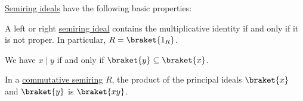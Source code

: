 \begin{proposition}\label{thm:def:semiring_ideal/properties}
  \hyperref[def:semiring_ideal]{Semiring ideals} have the following basic properties:
  \begin{thmenum}
     A left or right \hyperref[def:semiring_ideal]{semiring ideal} contains the multiplicative identity if and only if it is not proper. In particular, \( R = \braket{ 1_R } \).

     We have \( x \mid y \) if and only if \( \braket{y} \subseteq \braket{x} \).

     In a \hyperref[def:semiring/commutative]{commutative semiring} \( R \), the product of the principal ideals \( \braket{x} \) and \( \braket{y} \) is \( \braket{xy} \).
  \end{thmenum}
\end{proposition}
